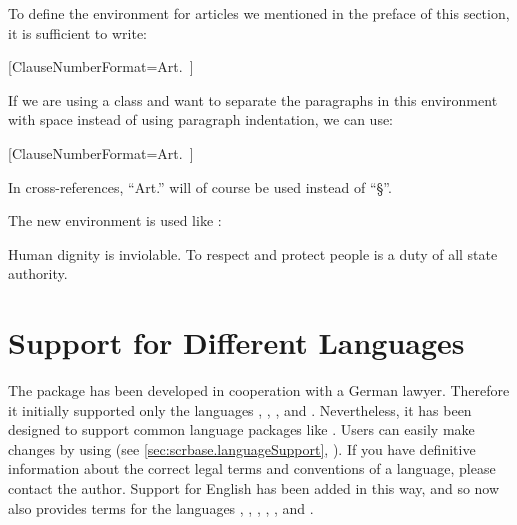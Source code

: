 \begin{Example}
  To define the environment for articles we mentioned in the preface of this
  section, it is sufficient to write:
\begin{lstcode}
  [ClauseNumberFormat=Art.~]{}{}
\end{lstcode}
  If we are using a \KOMAScript{} class and want to separate the paragraphs in
  this environment with space instead of using paragraph indentation, we can
  use:
\begin{lstcode}
  [ClauseNumberFormat=Art.~]
                            {}{}
\end{lstcode}
  In cross-references, ``Art.'' will  of course be used instead of ``\S''.%

  The new environment is used like :
\begin{lstcode}
  \begin{Article}
    \Clause{}
    Human dignity is inviolable. To respect and protect people is a
    duty of all state authority.
  \end{Article}
\end{lstcode}
\end{Example}%
\EndIndexGroup


\section{Support for Different Languages}

The  package has been developed in cooperation with a German
lawyer. Therefore it initially supported only the languages ,
, , and . Nevertheless, it
has been designed to support common language packages like
. Users can
easily make changes by using  (see
\autoref{sec:scrbase.languageSupport},
). If you have definitive
information about the correct legal terms and conventions of a language,
please contact the \KOMAScript{} author. Support for English has been added in
this way, and so  now also provides terms for the languages
, , , ,
, and .

